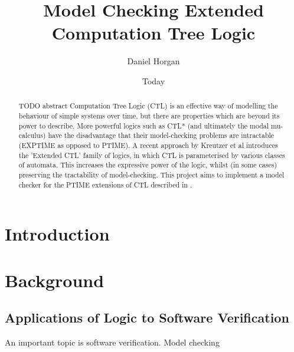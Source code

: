 \documentclass[11pt]{article}
\begin{document}
\title{Model Checking Extended Computation Tree Logic}
\author{Daniel Horgan}
\date{Today}
\maketitle

\begin{comment}
[scratch]
Blablabla said Nobody ~\cite{Nobody06}.
\end{comment}

\begin{abstract}

TODO abstract
Computation Tree Logic (CTL) is an effective way of modelling the behaviour of simple systems over time, but there are properties which are beyond its power to describe. More powerful logics such as CTL* (and ultimately the modal mu-calculus) have the disadvantage that their model-checking problems are intractable (EXPTIME as opposed to PTIME). A recent approach by Kreutzer et al \cite{Kreutzer10} introduces the 'Extended CTL' family of logics, in which CTL is parameterised by various classes of automata. This increases the expressive power of the logic, whilst (in some cases) preserving the tractability of model-checking. This project aims to implement a model checker for the PTIME extensions of CTL described in \cite{Kreutzer10}.

\end{abstract}

\section{Introduction}



\section{Background}

\subsection{Applications of Logic to Software Verification}

An important topic 
is software verification.
Model checking
\end{document}
